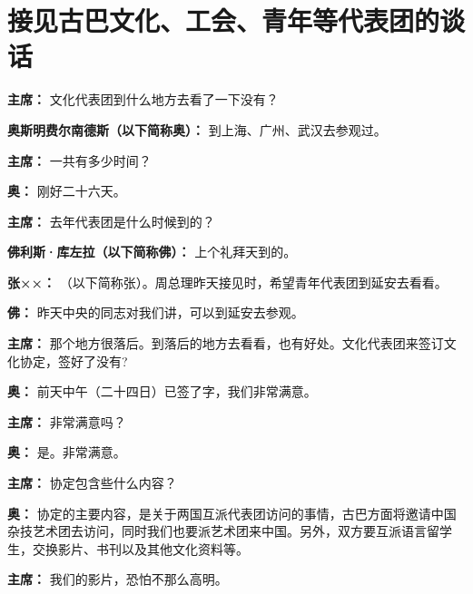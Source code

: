 \section[接见古巴文化、工会、青年等代表团的谈话（一九六三年七月二十六日）]{接见古巴文化、工会、青年等代表团的谈话}

\begin{duihua}

\item[\textbf{主席：}] 文化代表团到什么地方去看了一下没有？

\item[\textbf{奥斯明费尔南德斯（以下简称奥）：}] 到上海、广州、武汉去参观过。

\item[\textbf{主席：}] 一共有多少时间？

\item[\textbf{奥：}] 刚好二十六天。

\item[\textbf{主席：}] 去年代表团是什么时候到的？

\item[\textbf{佛利斯·库左拉（以下简称佛）：}] 上个礼拜天到的。

\item[\textbf{张××：}] （以下简称张）。周总理昨天接见时，希望青年代表团到延安去看看。

\item[\textbf{佛：}] 昨天中央的同志对我们讲，可以到延安去参观。

\item[\textbf{主席：}] 那个地方很落后。到落后的地方去看看，也有好处。文化代表团来签订文化协定，签好了没有?

\item[\textbf{奥：}] 前天中午（二十四日）已签了字，我们非常满意。

\item[\textbf{主席：}] 非常满意吗？

\item[\textbf{奥：}] 是。非常满意。

\item[\textbf{主席：}] 协定包含些什么内容？

\item[\textbf{奥：}] 协定的主要内容，是关于两国互派代表团访问的事情，古巴方面将邀请中国杂技艺术团去访问，同时我们也要派艺术团来中国。另外，双方要互派语言留学生，交换影片、书刊以及其他文化资料等。

\item[\textbf{主席：}] 我们的影片，恐怕不那么高明。


\end{duihua}
